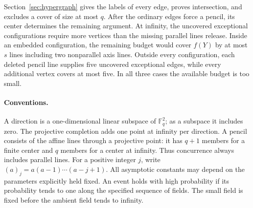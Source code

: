 \documentclass[11pt]{article}
\theoremstyle{remark}
\newcommand{\F}{\mathbb F}
\begin{document}
Section~\ref{sec:hypergraph} gives the labels of every edge, proves
intersection, and excludes a cover of size at most $q$. After the
ordinary edges force a pencil, its center determines the remaining
argument. At infinity, the uncovered exceptional configurations
require more vertices than the missing parallel lines release.
Inside an embedded configuration, the remaining budget would cover
$f(Y)$ by at most $s$ lines including two nonparallel axis lines.
Outside every configuration, each deleted pencil line supplies five
uncovered exceptional edges, while every additional vertex covers at
most five. In all three cases the available budget is too small.

\paragraph{Conventions.}
A direction is a one-dimensional linear subspace of $\F_q^2$; as a subspace
it includes zero. The projective completion adds one point at infinity per
direction. A pencil consists of the affine lines through a projective point:
it has $q+1$ members for a finite center and $q$ members for a center at
infinity. Thus concurrence always includes parallel lines.
For a positive integer $j$, write $(a)_j=a(a-1)\cdots(a-j+1)$.
All asymptotic constants may depend on the parameters explicitly held fixed.
An event holds with high probability if its probability tends to one along
the specified sequence of fields. The small field is fixed before the
ambient field tends to infinity.








\end{document}
